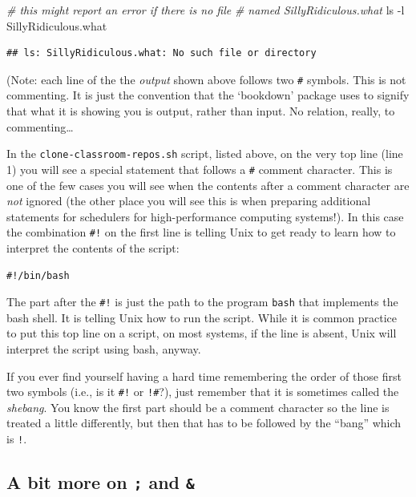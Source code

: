 \documentclass[]{krantz}
\makeatletter
\newenvironment{Shaded}{\begin{snugshade}}{\end{snugshade}}
\newcommand{\CommentTok}[1]{\textcolor[rgb]{0.37,0.37,0.37}{\textit{#1}}}
\newcommand{\FunctionTok}[1]{\textcolor[rgb]{0,0,0}{#1}}
\newcommand{\NormalTok}[1]{#1}
\newenvironment{kframe}{%
\medskip{}
\setlength{\fboxsep}{.8em}
 \def\at@end@of@kframe{}%
 \ifinner\ifhmode%
  \def\at@end@of@kframe{\end{minipage}}%
  \begin{minipage}{\columnwidth}%
 \fi\fi%
 \def\FrameCommand##1{\hskip\@totalleftmargin \hskip-\fboxsep
 \colorbox{shadecolor}{##1}\hskip-\fboxsep
     \hskip-\linewidth \hskip-\@totalleftmargin \hskip\columnwidth}%
 \MakeFramed {\advance\hsize-\width
   \@totalleftmargin\z@ \linewidth\hsize
   \@setminipage}}%
 {\par\unskip\endMakeFramed%
 \at@end@of@kframe}
\renewenvironment{Shaded}{\begin{kframe}}{\end{kframe}}
\makeatother
\begin{document}
\begin{Shaded}
\begin{Highlighting}[]
\CommentTok{# this might report an error if there is no file}
\CommentTok{# named SillyRidiculous.what}
\FunctionTok{ls}\NormalTok{ -l SillyRidiculous.what}
\end{Highlighting}
\end{Shaded}

\begin{verbatim}
## ls: SillyRidiculous.what: No such file or directory
\end{verbatim}

(Note: each line of the the \emph{output} shown above follows two \texttt{\#} symbols. This
is not commenting. It is just the convention that the `bookdown' package uses to signify that
what it is showing you is output, rather than input. No relation, really, to commenting\ldots{}

In the \texttt{clone-classroom-repos.sh} script, listed above, on the very top line (line 1) you will see
a special statement that follows a \texttt{\#} comment character. This is one of the few cases you will
see when the contents after a comment character are \emph{not} ignored (the other place you will see this
is when preparing additional statements for schedulers for high-performance computing systems!).
In this case the combination \texttt{\#!} on the first line is telling Unix to get ready to learn how
to interpret the contents of the script:

\begin{verbatim}
#!/bin/bash
\end{verbatim}

The part after the \texttt{\#!} is just
the path to the program \texttt{bash} that implements the bash shell. It is telling Unix
how to run the script. While it is common practice to put this top line on a script,
on most systems, if the line is absent, Unix will interpret the script using bash, anyway.

If you ever find yourself having a hard time remembering the order of those first two
symbols (i.e., is it \texttt{\#!} or \texttt{!\#}?), just remember that it is sometimes called
the \emph{shebang}. You know the first part should be a comment character so the line is treated
a little differently, but then that has to be followed by the ``bang'' which is \texttt{!}.

\hypertarget{a-bit-more-on-and}{%
\subsection{\texorpdfstring{A bit more on \texttt{;} and \texttt{\&}}{A bit more on ; and \&}}\label{a-bit-more-on-and}}
\end{document}
